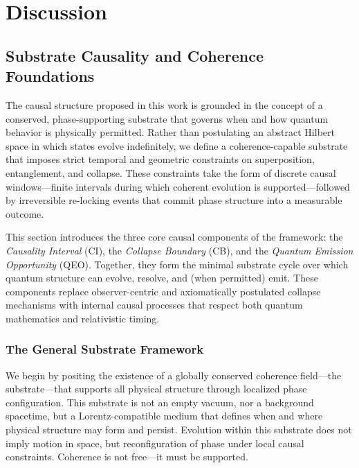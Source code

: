 \documentclass[entropy,article,submit,pdftex,moreauthors]{Definitions/mdpi}
\begin{document}

\section{Discussion}
\subsection{Substrate Causality and Coherence Foundations}
\label{sec:substratefoundation}

The causal structure proposed in this work is grounded in the concept of a conserved, phase-supporting substrate that governs when and how quantum behavior is physically permitted. Rather than postulating an abstract Hilbert space in which states evolve indefinitely, we define a coherence-capable substrate that imposes strict temporal and geometric constraints on superposition, entanglement, and collapse. These constraints take the form of discrete causal windows—finite intervals during which coherent evolution is supported—followed by irreversible re-locking events that commit phase structure into a measurable outcome.

This section introduces the three core causal components of the framework: the \textit{Causality Interval} (CI), the \textit{Collapse Boundary} (CB), and the \textit{Quantum Emission Opportunity} (QEO). Together, they form the minimal substrate cycle over which quantum structure can evolve, resolve, and (when permitted) emit. These components replace observer-centric and axiomatically postulated collapse mechanisms with internal causal processes that respect both quantum mathematics and relativistic timing.

\subsubsection{The General Substrate Framework}

We begin by positing the existence of a globally conserved coherence field—the substrate—that supports all physical structure through localized phase configuration. This substrate is not an empty vacuum, nor a background spacetime, but a Lorentz-compatible medium that defines when and where physical structure may form and persist. Evolution within this substrate does not imply motion in space, but reconfiguration of phase under local causal constraints. Coherence is not free—it must be supported.
\end{document}

